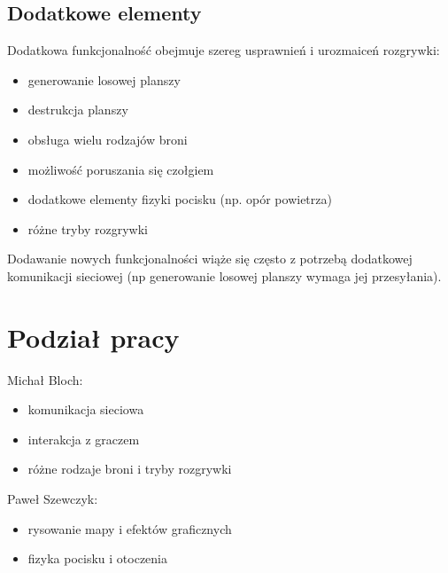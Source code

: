 \documentclass[12pt,a4paper]{article}
\begin{document}
\subsection{Dodatkowe elementy}
Dodatkowa funkcjonalność obejmuje szereg usprawnień i urozmaiceń rozgrywki:
\begin{itemize}
\item generowanie losowej planszy
\item destrukcja planszy
\item obsługa wielu rodzajów broni
\item możliwość poruszania się czołgiem
\item dodatkowe elementy fizyki pocisku (np. opór powietrza)
\item różne tryby rozgrywki
\end{itemize}
Dodawanie nowych funkcjonalności wiąże się często z potrzebą dodatkowej komunikacji sieciowej (np generowanie losowej planszy wymaga jej przesyłania).

\section{Podział pracy}

Michał Bloch:
\begin{itemize}
\item komunikacja sieciowa
\item interakcja z graczem
\item różne rodzaje broni i tryby rozgrywki
\end{itemize}
Paweł Szewczyk:
\begin{itemize}
\item rysowanie mapy i efektów graficznych
\item fizyka pocisku i otoczenia
\end{itemize}
\end{document}
